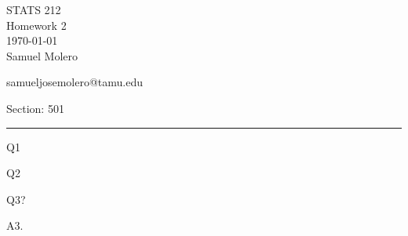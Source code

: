 \documentclass[12pt,letterpaper, onecolumn]{exam}
\begin{document}
\begingroup  
    \centering
    \LARGE STATS 212\\
    \LARGE Homework 2\\[0.5em]
    \large \today\\[0.5em]
    \large Samuel Molero\par
    \large samueljosemolero@tamu.edu\par
    \large Section: 501\par
\endgroup
\rule{\textwidth}{0.4pt}
\pointsdroppedatright   %
\printanswers
\renewcommand{\solutiontitle}{\noindent\textbf{Ans:}\enspace}   %

\begin{questions}

    \question Q1

    \question Q2
    \begin{solution}
        \begin{parts}
            \part 
            \part 
            \part
            \part
        \end{parts}
    \end{solution}

    \pagebreak %
    
     Q3?\droppoints
    
    \begin{solution}
            A3.
    \end{solution}
    
\end{questions}
\end{document}
